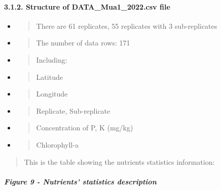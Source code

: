 \documentclass[
]{article}
\begin{document}
\hypertarget{structure-of-data_mua1_2022.csv-file}{%
\paragraph{\texorpdfstring{\textbf{3.1.2. Structure of
DATA\_Mua1\_2022.csv
file}}{3.1.2. Structure of DATA\_Mua1\_2022.csv file}}\label{structure-of-data_mua1_2022.csv-file}}

\begin{itemize}
\item
  \begin{quote}
  There are 61 replicates, 55 replicates with 3 sub-replicates
  \end{quote}
\item
  \begin{quote}
  The number of data rows: 171
  \end{quote}
\item
  \begin{quote}
  Including:
  \end{quote}
\end{itemize}

\begin{itemize}
\item
  \begin{quote}
  Latitude
  \end{quote}
\item
  \begin{quote}
  Longitude
  \end{quote}
\item
  \begin{quote}
  Replicate, Sub-replicate
  \end{quote}
\item
  \begin{quote}
  Concentration of P, K (mg/kg)
  \end{quote}
\item
  \begin{quote}
  Chlorophyll-a
  \end{quote}
\end{itemize}

\begin{quote}
This is the table showing the nutrients statistics information:
\end{quote}

\hypertarget{figure-9---nutrients-statistics-description}{%
\subparagraph{\texorpdfstring{\textbf{Figure 9} - Nutrients' statistics
description}{Figure 9 - Nutrients' statistics description}}\label{figure-9---nutrients-statistics-description}}
\end{document}

